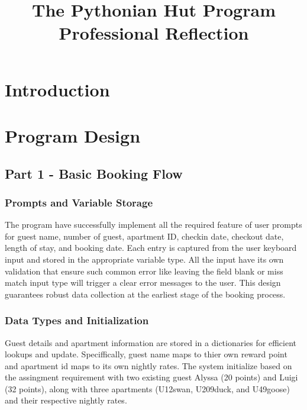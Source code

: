 \documentclass[conference]{IEEEtran}
\begin{document}
\title{The Pythonian Hut Program\\
{\footnotesize Professional Reflection}
}

\author{
}

\maketitle

\section{Introduction}


\section{Program Design}
\subsection{Part 1 - Basic Booking Flow}
\subsubsection{Prompts and Variable Storage}
The program have successfully implement all the required feature of user prompts for guest name, number of guest, apartment ID, checkin date, checkout date, length of stay, and booking date. Each entry is captured from the user keyboard input and stored in the appropriate variable type. All the input have its own validation that ensure such common error like leaving the field blank or miss match input type will trigger a clear error messages to the user. This design guarantees robust data collection at the earliest stage of the booking process.
\subsubsection{Data Types and Initialization}
Guest details and apartment information are stored in a dictionaries for efficient lookups and update. Speciffically, guest name maps to thier own reward point and apartment id maps to its own nightly rates. The system initialize based on the assingment requirement with two existing guest Alyssa (20 points) and Luigi (32 points), along with three apartments (U12swan, U209duck, and U49goose) and their respective nightly rates.
\end{document}
